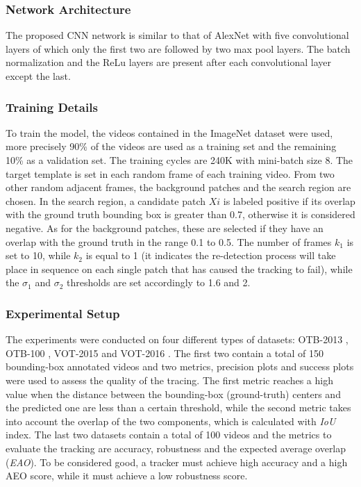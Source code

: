\subsubsection{Network Architecture}
The proposed CNN network is similar to that of AlexNet \cite{0893551108} with five convolutional 
layers of which only the first two are followed by two max pool 
layers. The batch normalization \cite{0893551138} and the ReLu layers are present after 
each convolutional layer except the last.

\subsubsection{Training Details}
To train the model, the videos contained in the ImageNet dataset were used, 
more precisely 90\% of the videos are used as a training set and the remaining 
10\% as a validation set. The training cycles are 240K with mini-batch size 8. 
The target template is set in each random frame of each training video. From 
two other random adjacent frames, the background patches and the search 
region are chosen. In the search region, a candidate patch $Xi$ is labeled 
positive if its overlap with the ground truth bounding box is greater than 
0.7, otherwise it is considered negative. As for the background patches, these 
are selected if they have an overlap with the ground truth in the range 0.1 to 
0.5. The number of frames $k_1$ is set to 10, while $k_2$ is equal to 1 (it 
indicates the re-detection process will take place in sequence on each single 
patch that has caused the tracking to fail), while the $\sigma_1$ and $\sigma_2$ thresholds 
are set accordingly to 1.6 and 2.

\subsubsection{Experimental Setup}
The experiments were conducted on four different types of datasets: OTB-2013 
\cite{0893551142}, OTB-100 \cite{0893551143}, VOT-2015 \cite{0893551144} and VOT-2016 \cite{0893551140}. The first two contain 
a total of 150 bounding-box annotated videos and two metrics, precision 
plots and success plots were used to assess the quality of the tracing. The 
first metric reaches a high value when the distance between the bounding-box 
(ground-truth) centers and the predicted one are less than a certain threshold, 
while the second metric takes into account the overlap of the two components, 
which is calculated with \emph{IoU} index. The last two datasets contain 
a total of 100 videos and the metrics to evaluate the tracking are accuracy, 
robustness and the expected average overlap (\emph{EAO}). To be considered good, 
a tracker must achieve high accuracy and a high AEO score, while it must 
achieve a low robustness score.